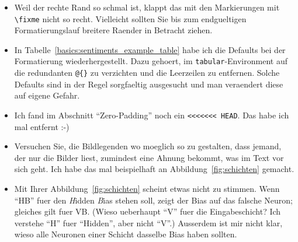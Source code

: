 \begin{itemize}
\item Weil der rechte Rand so schmal ist, klappt das mit den Markierungen mit \verb+\fixme+ nicht so recht. Vielleicht sollten Sie bis zum endgueltigen Formatierungslauf breitere Raender in Betracht ziehen.

\item In Tabelle~\ref{basics:sentiments_example_table} habe ich die Defaults bei der Formatierung wiederhergestellt. Dazu gehoert, im \verb+tabular+-Environment auf die redundanten \verb+@{}+ zu verzichten und die Leerzeilen zu entfernen. Solche Defaults sind in der Regel sorgfaeltig ausgesucht und man veraendert diese auf eigene Gefahr.

\item Ich fand im Abschnitt ``Zero-Padding'' noch ein \verb+<<<<<<< HEAD+. Das habe ich mal entfernt :-)

\item Versuchen Sie, die Bildlegenden wo moeglich so zu gestalten, dass jemand, der nur die Bilder liest, zumindest eine Ahnung bekommt, was im Text vor sich geht. Ich habe das mal beispielhaft an Abbildung~\ref{fig:schichten} gemacht.

\item Mit Ihrer Abbildung~\ref{fig:schichten} scheint etwas nicht zu stimmen. Wenn ``HB'' fuer den \emph{H}idden \emph{B}ias stehen soll, zeigt der Bias auf das falsche Neuron; gleiches gilt fuer VB. (Wieso ueberhaupt ``V'' fuer die Eingabeschicht? Ich verstehe ``H'' fuer ``Hidden'', aber nicht ``V''.) Ausserdem ist mir nicht klar, wieso alle Neuronen einer Schicht dasselbe Bias haben sollten.

\end{itemize}
